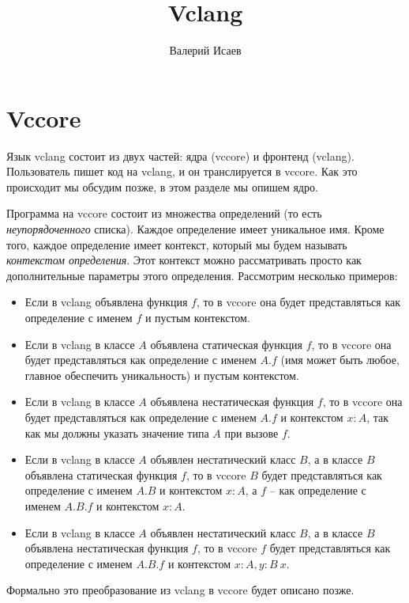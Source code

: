 \documentclass{amsart}
\theoremstyle{definition}
\theoremstyle{remark}
\numberwithin{figure}{section}
\begin{document}
\title{Vclang}

\author{Валерий Исаев}


\maketitle

\section{Vccore}

Язык vclang состоит из двух частей: ядра (vccore) и фронтенд (vclang).
Пользователь пишет код на vclang, и он транслируется в vccore.
Как это происходит мы обсудим позже, в этом разделе мы опишем ядро.

Программа на vccore состоит из множества определений (то есть \emph{неупорядоченного} списка).
Каждое определение имеет уникальное имя.
Кроме того, каждое определение имеет контекст, который мы будем называть \emph{контекстом определения}.
Этот контекст можно рассматривать просто как дополнительные параметры этого определения.
Рассмотрим несколько примеров:
\begin{itemize}
\item Если в vclang объявлена функция $f$, то в vccore она будет представляться как определение с именем $f$ и пустым контекстом.
\item Если в vclang в классе $A$ объявлена статическая функция $f$, то в vccore она будет представляться как определение с именем $A.f$ (имя может быть любое, главное обеспечить уникальность) и пустым контекстом.
\item Если в vclang в классе $A$ объявлена нестатическая функция $f$, то в vccore она будет представляться как определение с именем $A.f$ и контекстом $x : A$, так как мы должны указать значение типа $A$ при вызове $f$.
\item Если в vclang в классе $A$ объявлен нестатический класс $B$, а в классе $B$ объявлена статическая функция $f$, то в vccore $B$ будет представляться как определение с именем $A.B$ и контекстом $x : A$, а $f$ -- как определение с именем $A.B.f$ и контекстом $x : A$.
\item Если в vclang в классе $A$ объявлен нестатический класс $B$, а в классе $B$ объявлена нестатическая функция $f$, то в vccore $f$ будет представляться как определение с именем $A.B.f$ и контекстом $x : A, y : B\ x$.
\end{itemize}
Формально это преобразование из vclang в vccore будет описано позже.
\end{document}
